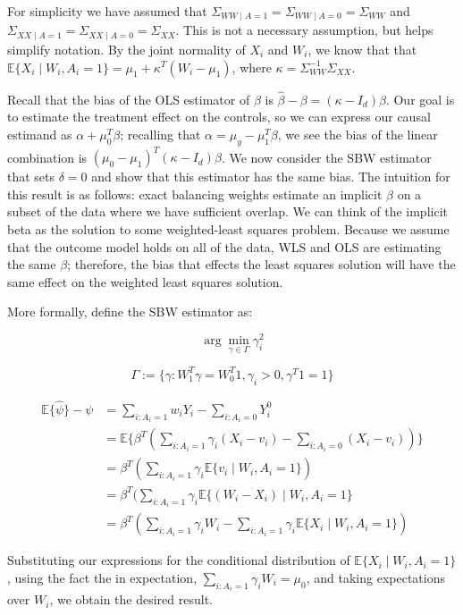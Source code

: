 \documentclass[12pt]{article}
\begin{document}
For simplicity we have assumed that $\Sigma_{WW \mid A = 1} = \Sigma_{WW \mid A = 0} = \Sigma_{WW}$ and $\Sigma_{XX \mid A = 1} = \Sigma_{XX \mid A = 0} = \Sigma_{XX}$. This is not a necessary assumption, but helps simplify notation. By the joint normality of $X_i$ and $W_i$, we know that that $\mathbb{E}\{X_i \mid W_i, A_i = 1\} = \mu_1 + \kappa^T(W_i - \mu_1)$, where $\kappa = \Sigma_{WW}^{-1}\Sigma_{XX}$.

Recall that the bias of the OLS estimator of $\beta$ is $\hat{\beta} - \beta = (\kappa - I_d)\beta$. Our goal is to estimate the treatment effect on the controls, so we can express our causal estimand as $\alpha + \mu_0^T\beta$; recalling that $\alpha = \mu_y - \mu_1^T\beta$, we see the bias of the linear combination is $(\mu_0 - \mu_1)^T(\kappa - I_d)\beta$. We now consider the SBW estimator that sets $\delta = 0$ and show that this estimator has the same bias. The intuition for this result is as follows: exact balancing weights estimate an implicit $\beta$ on a subset of the data where we have sufficient overlap. We can think of the implicit beta as the solution to some weighted-least squares problem. Because we assume that the outcome model holds on all of the data, WLS and OLS are estimating the same $\beta$; therefore, the bias that effects the least squares solution will have the same effect on the weighted least squares solution.

More formally, define the SBW estimator as:

$$
\arg\min_{\gamma \in \Gamma} \gamma_i^2
$$

$$
\Gamma := \{\gamma: W_1^T\gamma = W_0^T1, \gamma_i > 0, \gamma^T1 = 1\}
$$

\begin{align*}
    \mathbb{E}\{\hat{\psi}\} - \psi &= \sum_{i: A_i = 1}w_iY_i - \sum_{i: A_i = 0}Y_i^0 \\
    &= \mathbb{E}\{\beta^T(\sum_{i: A_i = 1} \gamma_i (X_i - v_i) - \sum_{i: A_i = 0} (X_i - v_i))\} \\
    &= \beta^T(\sum_{i: A_i = 1} \gamma_i\mathbb{E}\{v_i \mid W_i, A_i = 1\}) \\
    &= \beta^T(\sum_{i: A_i = 1} \gamma_i\mathbb{E}\{(W_i - X_i) \mid W_i, A_i = 1\} \\
    &= \beta^T(\sum_{i: A_i = 1} \gamma_iW_i - \sum_{i: A_i = 1} \gamma_i\mathbb{E}\{X_i \mid W_i, A_i = 1\})
\end{align*}

Substituting our expressions for the conditional distribution of $\mathbb{E}\{X_i \mid W_i, A_i = 1\}$, using the fact the in expectation, $\sum_{i: A_i = 1}\gamma_iW_i = \mu_0$, and taking expectations over $W_i$, we obtain the desired result.
\end{document}
